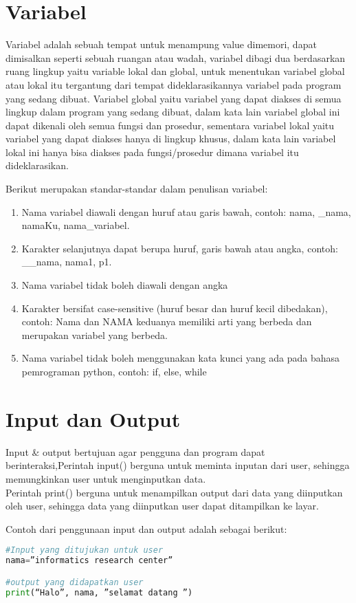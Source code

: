 \section{Variabel}
Variabel adalah sebuah tempat untuk menampung value dimemori, dapat dimisalkan seperti sebuah ruangan atau wadah, variabel dibagi dua berdasarkan ruang lingkup yaitu variable lokal dan global, untuk menentukan variabel global atau lokal itu tergantung dari tempat dideklarasikannya variabel pada program yang sedang dibuat. Variabel global yaitu variabel yang dapat diakses di semua lingkup dalam program yang sedang dibuat, dalam kata lain variabel global ini dapat dikenali oleh semua fungsi dan prosedur, sementara variabel lokal yaitu variabel yang dapat diakses hanya di lingkup khusus, dalam kata lain variabel lokal ini hanya bisa diakses pada fungsi/prosedur dimana variabel itu dideklarasikan.
\par
Berikut merupakan standar-standar dalam penulisan variabel:
\begin{enumerate}
\item Nama variabel diawali dengan huruf atau garis bawah, contoh: nama, \_nama, namaKu, nama\_variabel.
\item Karakter selanjutnya dapat berupa huruf, garis bawah atau angka, contoh: \_\_nama, nama1, p1.
\item  Nama variabel tidak boleh diawali dengan angka
\item Karakter bersifat case-sensitive (huruf besar dan huruf kecil dibedakan), contoh: Nama dan NAMA keduanya memiliki arti yang berbeda dan merupakan variabel yang berbeda.
\item Nama variabel tidak boleh menggunakan kata kunci yang ada pada bahasa pemrograman python, contoh: if, else, while
\end{enumerate}

\section{Input dan Output}
Input \& output bertujuan agar pengguna dan program dapat berinteraksi,Perintah input() berguna untuk meminta inputan dari user, sehingga memungkinkan user untuk menginputkan data.\\
Perintah print() berguna untuk menampilkan output dari data yang diinputkan oleh user, sehingga data yang diinputkan user dapat ditampilkan ke layar.
\par
Contoh dari penggunaan input dan output adalah sebagai berikut:
\begin{lstlisting}[language=Python]
#Input yang ditujukan untuk user
nama=”informatics research center” 

#output yang didapatkan user
print(“Halo”, nama, ”selamat datang ”)
\end{lstlisting}

